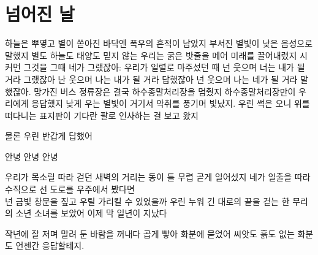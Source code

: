 \hypertarget{uxb118uxc5b4uxc9c4-uxb0a0}{%

\chapter{넘어진 날}\label{uxb118uxc5b4uxc9c4-uxb0a0}}



하늘은 뿌옇고 별이 쏟아진 바닥엔 폭우의 흔적이 남았지 부서진 별빛이 낮은 음성으로 말했지 별도 하늘도 태양도 믿지 않는 우리는 굵은 밧줄을 메어 미래를 끌어내렸지 시커먼 그것을 그때 네가 그랬잖아: 우리가 일렬로 마주섰던 때 넌 웃으며 너는 내가 될 거라 그랬잖아 난 웃으며 나는 내가 될 거라 답했잖아 넌 웃으며 나는 네가 될 거라 말했잖아. 망가진 버스 정류장은 결국 하수종말처리장을 멈췄지 하수종말처리장만이 우리에게 응답했지 낮게 우는 별빛이 거기서 악취를 풍기며 빛났지. 우린 썩은 오니 위를 떠다니는 표지판이 기다란 팔로 인사하는 걸 보고 왔지



물론 우린 반갑게 답했어



안녕 안녕 안녕



우리가 목소릴 따라 걷던 새벽의 거리는 동이 틀 무렵 곧게 일어섰지 네가 일출을 따라 수직으로 선 도로를 우주에서 봤다면\\

넌 금빛 창문을 짚고 우릴 가리킬 수 있었을까 우린 누워 긴 대로의 끝을 걷는 한 무리의 소년 소녀를 보았어 이제 막 일년이 지났다



작년에 잘 저며 말려 둔 바람을 꺼내다 곱게 빻아 화분에 묻었어 씨앗도 흙도 없는 화분도 언젠간 응답할테지.

